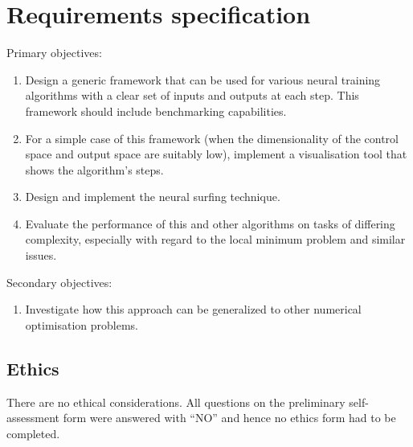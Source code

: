\chapter{Requirements specification}
Primary objectives:
\begin{enumerate}
    \item Design a generic framework that can be used for various neural training algorithms
    with a clear set of inputs and outputs at each step. This framework should include
    benchmarking capabilities.
    \item For a simple case of this framework (when the dimensionality of the control space
    and output space are suitably low), implement a visualisation tool that shows the
    algorithm’s steps.
    \item Design and implement the neural surfing technique.
    \item Evaluate the performance of this and other algorithms on tasks of differing
    complexity, especially with regard to the local minimum problem and similar issues.
\end{enumerate}
Secondary objectives:
\begin{enumerate}
    \item Investigate how this approach can be generalized to other numerical optimisation problems.
\end{enumerate}

\section{Ethics}
There are no ethical considerations. 
All questions on the preliminary self-assessment form were answered with ``NO'' and hence no ethics form had to be completed.
